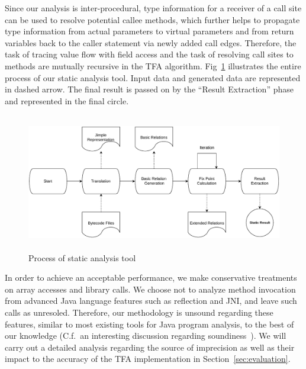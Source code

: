 \documentclass{fac}
\begin{document}
Since our analysis is inter-procedural, type information for a receiver of a call site can be used to resolve potential callee methods, which further helps to propagate type information from actual parameters to virtual parameters and from return variables back to the caller statement via newly added call edges. %
Therefore, the task of tracing value flow with field access and the task of resolving call sites to methods are mutually recursive in the TFA algorithm.
Fig~\ref{fig:static-process} illustrates the entire process of our static analysis tool. Input data and generated data are represented in dashed arrow. The final result is passed on by the ``Result Extraction'' phase and represented in the final circle.

\begin{figure}
\centering
\includegraphics[width=16cm,height=6cm]{static-process.pdf}
\caption{Process of static analysis tool}
\label{fig:static-process}
\end{figure}

In order to achieve an acceptable performance, we make conservative treatments on array accesses and library calls. We choose not to analyze method invocation from advanced Java language features such as reflection and JNI, and leave such calls as unresoled. Therefore, our methodology is unsound regarding these features, similar to most existing tools for Java program analysis, to the best of our knowledge (C.f.~an interesting discussion regarding soundiness~\cite{LivshitsSSLACGKMV15}). We will carry out a detailed analysis regarding the source of imprecision as well as their impact to the accuracy of the TFA implementation in Section~\ref{sec:evaluation}.
\end{document}
